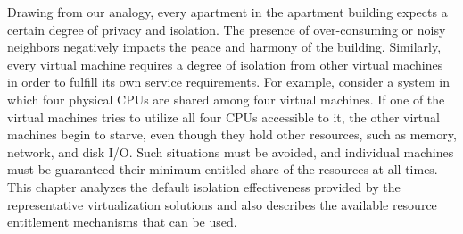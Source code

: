 Drawing from our analogy, every apartment in the apartment building expects a certain degree of privacy and isolation. The presence of over-consuming or noisy neighbors negatively impacts the peace and harmony of the building. Similarly, every virtual machine requires a degree of isolation from other virtual machines in order to fulfill its own service requirements. For example, consider a system in which four physical CPUs are shared among four virtual machines. If one of the virtual machines tries to utilize all four CPUs accessible to it, the other virtual machines begin to starve, even though they hold other resources, such as memory, network, and disk I/O. Such situations must be avoided, and individual machines must be guaranteed their minimum entitled share of the resources at all times. This chapter analyzes the default isolation effectiveness provided by the representative virtualization solutions and also describes the available resource entitlement mechanisms that can be used.



